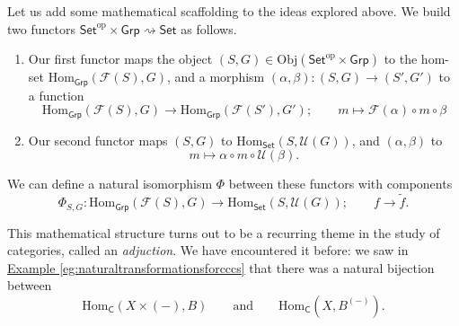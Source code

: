 \documentclass[a4paper]{report}
\newcommand{\Obj}{\mathrm{Obj}}
\newcommand{\Hom}{\mathrm{Hom}}
\theoremstyle{definition}
\theoremstyle{plain}
\theoremstyle{remark}
\begin{document}
Let us add some mathematical scaffolding to the ideas explored above. We build two functors $\mathsf{Set}^{\mathrm{op}} \times \mathsf{Grp} \rightsquigarrow \mathsf{Set}$ as follows.
\begin{enumerate}
  \item Our first functor maps the object $(S, G) \in \Obj(\mathsf{Set}^{\mathrm{op}} \times \mathsf{Grp})$ to the hom-set $\Hom_{\mathsf{Grp}}(\mathcal{F}(S), G)$, and a morphism $(\alpha, \beta)\colon (S,G) \to (S', G')$ to a function 
    \begin{equation*}
      \Hom_{\mathsf{Grp}}(\mathcal{F}(S), G) \to \Hom_{\mathsf{Grp}}(\mathcal{F}(S'), G');\qquad m \mapsto \mathcal{F}(\alpha) \circ m \circ \beta
    \end{equation*}

  \item Our second functor maps $(S, G)$ to $\Hom_{\mathsf{Set}}(S, \mathcal{U}(G))$, and $(\alpha, \beta)$ to 
    \begin{equation*}
      m \mapsto \alpha \circ m \circ \mathcal{U}(\beta).
    \end{equation*}
\end{enumerate}
We can define a natural isomorphism $\Phi$ between these functors with components
\begin{equation*}
  \Phi_{S, G}\colon \Hom_{\mathsf{Grp}}(\mathcal{F}(S), G) \to \Hom_{\mathsf{Set}}(S, \mathcal{U}(G));\qquad f \to \tilde{f}.
\end{equation*}

This mathematical structure turns out to be a recurring theme in the study of categories, called an \emph{adjuction}. We have encountered it before: we saw in \hyperref[eg:naturaltransformationsforcccs]{Example \ref*{eg:naturaltransformationsforcccs}} that there was a natural bijection between 
\begin{equation*}
  \Hom_{\mathsf{C}}(X \times (-), B)\qquad\text{and}\qquad \Hom_{\mathsf{C}}(X, B^{(-)}).
\end{equation*}
\end{document}
